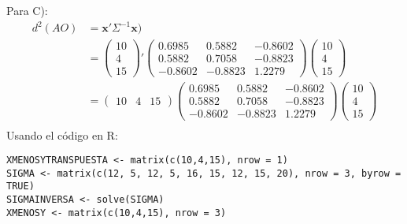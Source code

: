 \begin{sol}
Para C):
\begin{align*}
d^2(AO) &= \mathbf{x}' \Sigma^{-1} \mathbf{x})\\
&= 
\begin{pmatrix}
10 \\ 4 \\ 15
\end{pmatrix}'
\begin{pmatrix}
0.6985 &  0.5882 & -0.8602 \\
0.5882 & 0.7058 & -0.8823  \\
-0.8602 & -0.8823 & 1.2279
\end{pmatrix}
\begin{pmatrix}
10 \\ 4 \\ 15
\end{pmatrix}\\
&= 
\begin{pmatrix}
10&4&15
\end{pmatrix}
\begin{pmatrix}
0.6985 &  0.5882 & -0.8602 \\
0.5882 & 0.7058 & -0.8823  \\
-0.8602 & -0.8823 & 1.2279
\end{pmatrix}
\begin{pmatrix}
10\\4\\15
\end{pmatrix}\\
\end{align*}
Usando el código en R:
\begin{verbatim}
XMENOSYTRANSPUESTA <- matrix(c(10,4,15), nrow = 1)  
SIGMA <- matrix(c(12, 5, 12, 5, 16, 15, 12, 15, 20), nrow = 3, byrow = TRUE)
SIGMAINVERSA <- solve(SIGMA)
XMENOSY <- matrix(c(10,4,15), nrow = 3)


\end{verbatim}
\end{sol}
